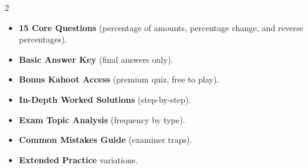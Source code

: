 \documentclass[11pt,a4paper]{article}
\newcommand{\FullReleaseDate}{April 30, 2026}
\begin{document}
\vspace{8pt}

\begin{multicols}{2}
  \begin{tcolorbox}[card, title=\sffamily\bfseries\textcolor{white}{\faHandPointDown\ TODAY (Simplified Version)}, colbacktitle=mainblue, boxed title style={sharp corners, boxrule=0pt}]
    \begin{itemize}[leftmargin=1.2em, itemsep=2pt]
      \item \small \textbf{15 Core Questions} (percentage of amounts, percentage change, and reverse percentages).
      \item \small \textbf{Basic Answer Key} (final answers only).
      \item \small \textbf{Bonus Kahoot Access} (premium quiz, free to play).
    \end{itemize}
  \end{tcolorbox}

  \columnbreak

  \begin{tcolorbox}[card, title=\sffamily\bfseries\textcolor{white}{\faRocket\ ON \FullReleaseDate\ (Full Upgrade)}, colbacktitle=mainblue, boxed title style={sharp corners, boxrule=0pt}]
    \begin{itemize}[leftmargin=1.2em, itemsep=2pt]
      \item \small \textbf{In-Depth Worked Solutions} (step-by-step).
      \item \small \textbf{Exam Topic Analysis} (frequency by type).
      \item \small \textbf{Common Mistakes Guide} (examiner traps).
      \item \small \textbf{Extended Practice} variations.
    \end{itemize}
  \end{tcolorbox}
\end{multicols}
\end{document}

